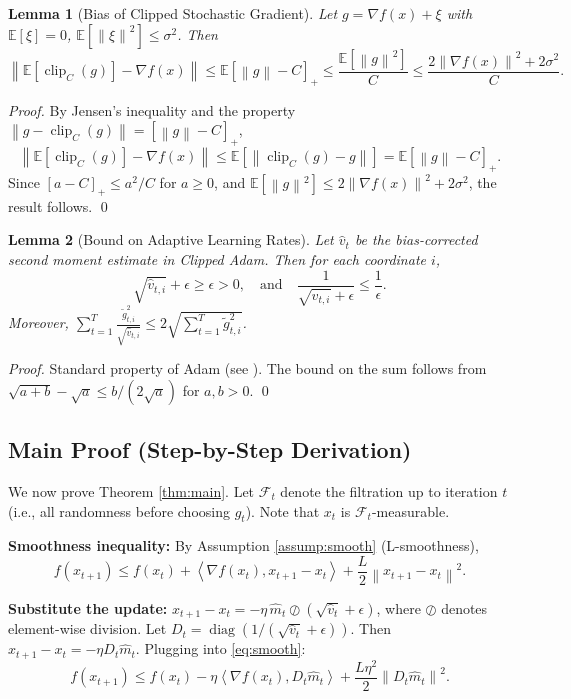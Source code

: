 \documentclass{article}
\newtheorem{lemma}{Lemma}
\newcommand{\E}{\mathbb{E}}
\newcommand{\norm}[1]{\left\| #1 \right\|}
\newcommand{\inner}[2]{\left\langle #1, #2 \right\rangle}
\newcommand{\clip}[2]{\operatorname{clip}_{#1}(#2)}
\newcommand{\step}[1]{\text{[Step #1]}}
\begin{document}
\begin{lemma}[Bias of Clipped Stochastic Gradient] \label{lem:clip_bias}
    Let $g = \nabla f(x) + \xi$ with $\E[\xi]=0$, $\E[\norm{\xi}^2] \le \sigma^2$. Then
    \[
        \norm{\E[\clip{C}{g}] - \nabla f(x)} \le \E[\norm{g} - C]_+ \le \frac{\E[\norm{g}^2]}{C} \le \frac{2\norm{\nabla f(x)}^2 + 2\sigma^2}{C}.
    \]
\end{lemma}
\begin{proof}
    By Jensen's inequality and the property $\norm{g - \clip{C}{g}} = [\norm{g}-C]_+$,
    \[
        \norm{\E[\clip{C}{g}] - \nabla f(x)} \le \E[\norm{\clip{C}{g} - g}] = \E[\norm{g}-C]_+.
    \]
    Since $[a-C]_+ \le a^2/C$ for $a \ge 0$, and $\E[\norm{g}^2] \le 2\norm{\nabla f(x)}^2 + 2\sigma^2$, the result follows. \qed
\end{proof}

\begin{lemma}[Bound on Adaptive Learning Rates] \label{lem:adaptive_bound}
    Let $\hat{v}_t$ be the bias-corrected second moment estimate in Clipped Adam. Then for each coordinate $i$,
    \[
        \sqrt{\hat{v}_{t,i}} + \epsilon \ge \epsilon > 0, \quad \text{and} \quad \frac{1}{\sqrt{\hat{v}_{t,i}} + \epsilon} \le \frac{1}{\epsilon}.
    \]
    Moreover, $\sum_{t=1}^T \frac{\tilde{g}_{t,i}^2}{\sqrt{\hat{v}_{t,i}}} \le 2 \sqrt{\sum_{t=1}^T \tilde{g}_{t,i}^2}$.
\end{lemma}
\begin{proof}
    Standard property of Adam (see \cite{kingma2014adam}). The bound on the sum follows from $\sqrt{a+b} - \sqrt{a} \le b/(2\sqrt{a})$ for $a,b>0$. \qed
\end{proof}

\subsection*{Main Proof (Step-by-Step Derivation)}

We now prove Theorem \ref{thm:main}. Let $\mathcal{F}_t$ denote the filtration up to iteration $t$ (i.e., all randomness before choosing $g_t$). Note that $x_t$ is $\mathcal{F}_t$-measurable.

\step{1} \textbf{Smoothness inequality:} By Assumption \ref{assump:smooth} (L-smoothness),
\begin{equation} \label{eq:smooth}
    f(x_{t+1}) \le f(x_t) + \inner{\nabla f(x_t)}{x_{t+1} - x_t} + \frac{L}{2} \norm{x_{t+1} - x_t}^2.
\end{equation}

\step{2} \textbf{Substitute the update:} $x_{t+1} - x_t = -\eta \, \hat{m}_t \oslash (\sqrt{\hat{v}_t} + \epsilon)$, where $\oslash$ denotes element-wise division. Let $D_t = \operatorname{diag}(1/(\sqrt{\hat{v}_t} + \epsilon))$. Then $x_{t+1} - x_t = -\eta D_t \hat{m}_t$. Plugging into \eqref{eq:smooth}:
\begin{equation}
    f(x_{t+1}) \le f(x_t) - \eta \inner{\nabla f(x_t)}{D_t \hat{m}_t} + \frac{L \eta^2}{2} \norm{D_t \hat{m}_t}^2.
\end{equation}
\end{document}

